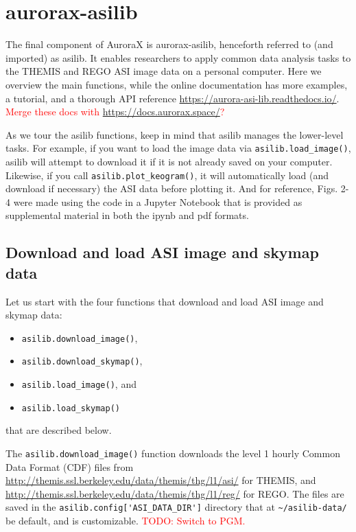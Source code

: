 \documentclass[draft]{agujournal2019}
\begin{document}
\section{aurorax-asilib}\label{aurorax-asilib}
The final component of AuroraX is aurorax-asilib, henceforth referred to (and imported) as asilib. It enables researchers to apply common data analysis tasks to the THEMIS and REGO ASI image data on a personal computer. Here we overview the main functions, while the online documentation has more examples, a tutorial, and a thorough API reference \url{https://aurora-asi-lib.readthedocs.io/}. \textcolor{red}{Merge these docs with \url{https://docs.aurorax.space/}?}

As we tour the asilib functions, keep in mind that asilib manages the lower-level tasks. For example, if you want to load the image data via \verb|asilib.load_image()|, asilib will attempt to download it if it is not already saved on your computer. Likewise, if you call \verb|asilib.plot_keogram()|, it will automatically load (and download if necessary) the ASI data before plotting it. And for reference, Figs. 2-4 were made using the code in a Jupyter Notebook that is provided as supplemental material in both the ipynb and pdf formats.

\subsection{Download and load ASI image and skymap data}
Let us start with the four functions that download and load ASI image and skymap data: 

\begin{itemize}
      \item \verb|asilib.download_image()|,
      \item \verb|asilib.download_skymap()|,
      \item \verb|asilib.load_image()|, and
      \item \verb|asilib.load_skymap()|
\end{itemize} that are described below.

The \verb|asilib.download_image()| function downloads the level 1 hourly Common Data Format (CDF) files from \url{http://themis.ssl.berkeley.edu/data/themis/thg/l1/asi/} for THEMIS, and \url{http://themis.ssl.berkeley.edu/data/themis/thg/l1/reg/} for REGO. The files are saved in the \verb|asilib.config['ASI_DATA_DIR']| directory that at \verb|~/asilib-data/| be default, and is customizable. \textcolor{red}{TODO: Switch to PGM.}
\end{document}
